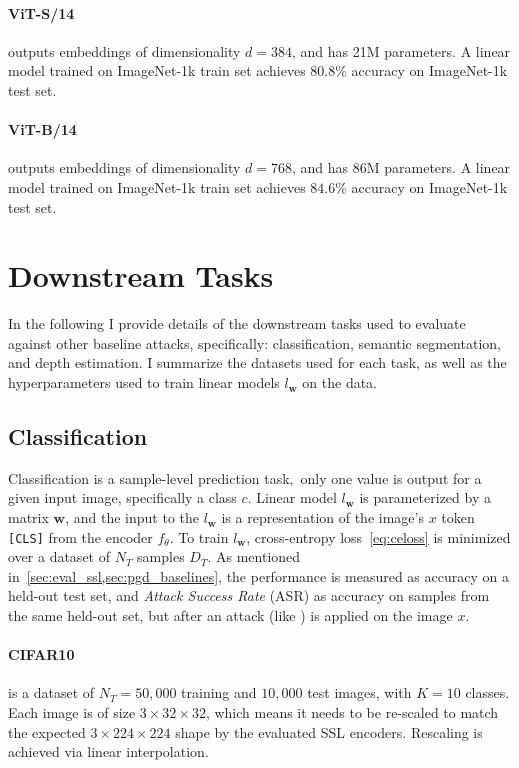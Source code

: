 \paragraph{ViT-S/14} outputs embeddings of dimensionality $d=384$, and has 21M parameters. A linear model trained on ImageNet-1k train set achieves $80.8\%$ accuracy on ImageNet-1k test set.

\paragraph{ViT-B/14} outputs embeddings of dimensionality $d=768$, and has 86M parameters. A linear model trained on ImageNet-1k train set achieves $84.6\%$ accuracy on ImageNet-1k test set.

\section{Downstream Tasks}

In the following I provide details of the downstream tasks used to evaluate \EmbedAttack against other baseline attacks, specifically: classification, semantic segmentation, and depth estimation. I summarize the datasets used for each task, as well as the hyperparameters used to train linear models $l_\mathbf{w}$ on the data.

\subsection{Classification}\label{sec:eval_clf}

Classification is a sample-level prediction task,~\ie only one value is output for a given input image, specifically a class $c$. Linear model $l_\mathbf{w}$ is parameterized by a matrix $\mathbf{w}$, and the input to the $l_\mathbf{w}$ is a representation of the image's $x$ token \texttt{[CLS]} from the encoder $f_\theta$. To train $l_\mathbf{w}$, cross-entropy loss~\cref{eq:celoss} is minimized over a dataset of $N_T$ samples $D_T$. As mentioned in~\cref{sec:eval_ssl,sec:pgd_baselines}, the performance is measured as accuracy on a held-out test set, and \textit{Attack Success Rate} (ASR) as accuracy on samples from the same held-out set, but after an attack (like \EmbedAttack) is applied on the image $x$.

\paragraph{CIFAR10~\cite{cifar}} is a dataset of $N_T=50,000$ training and $10,000$ test images, with $K=10$ classes. Each image is of size $3\times 32\times 32$, which means it needs to be re-scaled to match the expected $3\times 224\times 224$ shape by the evaluated SSL encoders. Rescaling is achieved via linear interpolation.


